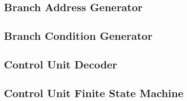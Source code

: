 \documentclass[a4paper]{report}
\begin{document}
		\newpage
		\subsection{Branch Address Generator}

			
		
			

		\newpage
		\subsection{Branch Condition Generator}

			
		
			
			

		\newpage
		\subsection{Control Unit Decoder}

			
		
			

		\newpage
		\subsection{Control Unit Finite State Machine}
\end{document}
